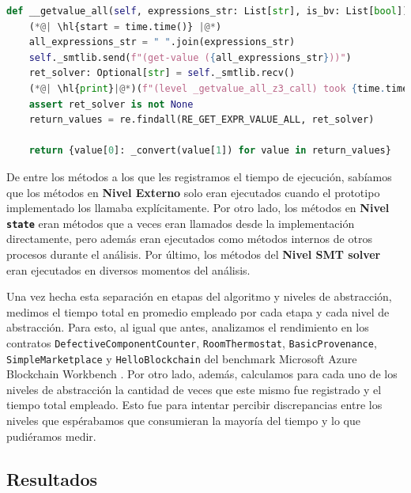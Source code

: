 \begin{lstlisting}[language=Python,
    label={code:getvalueall-modification},
    caption={Método \texttt{\_\_get\_value\_all} del modulo \textbf{\texttt{smtlib}} modificado para registrar el tiempo empleado por la llamada al SMT solver. El resaltado indica las líneas agregadas para registrar el tiempo.},
    captionpos=b]
def __getvalue_all(self, expressions_str: List[str], is_bv: List[bool]) -> Dict[str, int]:
    (*@| \hl{start = time.time()} |@*)
    all_expressions_str = " ".join(expressions_str)
    self._smtlib.send(f"(get-value ({all_expressions_str}))")
    ret_solver: Optional[str] = self._smtlib.recv()
    (*@| \hl{print}|@*)(f"(level _getvalue_all_z3_call) took {time.time()- start} seconds")
    assert ret_solver is not None
    return_values = re.findall(RE_GET_EXPR_VALUE_ALL, ret_solver)
    
    return {value[0]: _convert(value[1]) for value in return_values}
\end{lstlisting}

De  entre los métodos a los que les registramos el tiempo de ejecución, sabíamos que los métodos en \textbf{Nivel Externo} solo eran ejecutados cuando el prototipo implementado los llamaba explícitamente.
Por otro lado, los métodos en \textbf{Nivel \texttt{state}} eran métodos que a veces eran llamados desde la implementación directamente, pero además eran ejecutados como métodos internos de otros procesos durante el análisis.
Por último, los métodos del \textbf{Nivel SMT solver} eran ejecutados en diversos momentos del análisis.

Una vez hecha esta separación en etapas del algoritmo y niveles de abstracción, medimos el tiempo total en promedio empleado por cada etapa y cada nivel de abstracción.
Para esto, al igual que antes, analizamos el rendimiento en los contratos \texttt{DefectiveComponent\allowbreak Counter}, \texttt{RoomThermostat}, \texttt{BasicProvenance}, \texttt{SimpleMarketplace} y \texttt{HelloBlockchain} del benchmark Microsoft Azure Blockchain Workbench \cite{azure-benchmark}.
Por otro lado, además, calculamos para cada uno de los niveles de abstracción la cantidad de veces que este mismo fue registrado y el tiempo total empleado.
Esto fue para intentar percibir discrepancias entre los niveles que espérabamos que consumieran la mayoría del tiempo y lo que pudiéramos medir.

\subsection{Resultados}

